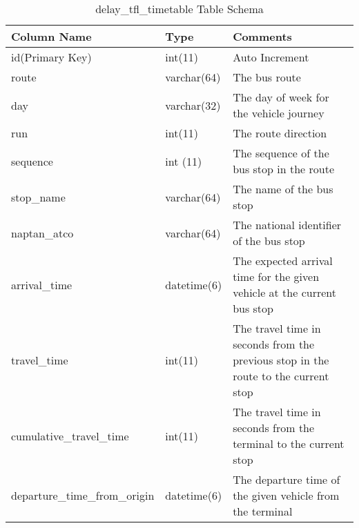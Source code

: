 \begin{table}
\centering
\begin{tabular}{@{}llp{6cm}@{}} \toprule
Column Name & Type & Comments\\ \midrule
id(Primary Key) & int(11)  & Auto Increment\\ [0.4cm]
route & varchar(64) & The bus route \\ [0.4cm]
day & varchar(32) & The day of week for the vehicle journey \\ [0.4cm]
run & int(11) & The route direction \\ [0.4cm]
sequence & int (11) & The sequence of the bus stop in the route \\ [0.4cm]
stop\_name & varchar(64) & The name of the bus stop \\ [0.4cm]
naptan\_atco & varchar(64) & The national identifier of the bus stop \\ [0.4cm]
arrival\_time & datetime(6) & The expected arrival time for the given vehicle at the current bus stop \\ [0.4cm]
travel\_time & int(11) & The travel time in seconds from the previous stop in the route to the current stop \\ [0.4cm]
cumulative\_travel\_time & int(11) & The travel time  in seconds from the terminal to the current stop \\ [0.4cm]
departure\_time\_from\_origin & datetime(6) & The departure time of the given vehicle from the terminal \\
\bottomrule
\end{tabular}
\caption{delay\_tfl\_timetable Table Schema}
\label{table:delay_tfl_timetable}
\end{table}
